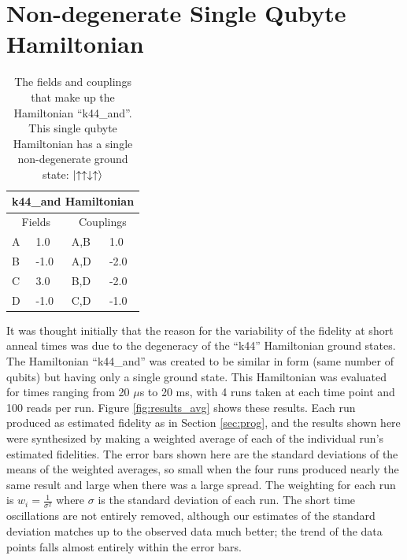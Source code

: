 \section{Non-degenerate Single Qubyte Hamiltonian}

\begin{table}
	\begin{center}
\begin{tabular}{ | l | l | l | l |}
	\hline
	\multicolumn{4}{|c|}{k44\_and Hamiltonian} \\ \hline
	\multicolumn{2}{|c|}{Fields} & \multicolumn{2}{c|}{Couplings} \\ \hline
	A & 1.0 & A,B & 1.0 \\
	B & -1.0 & A,D & -2.0 \\
	C & 3.0 & B,D & -2.0 \\
	D & -1.0 & C,D & -1.0 \\ \hline
\end{tabular}
\end{center}
\caption[k44\_and Hamiltonian]{The fields and couplings that make up the Hamiltonian ``k44\_and''.  This single qubyte Hamiltonian has a single non-degenerate ground state: $\mathinner{|{\uparrow\uparrow\downarrow\uparrow}\rangle}$ }
\label{tab:k44_and}
\end{table}
It was thought initially that the reason for the variability of the fidelity at short anneal times was due to the degeneracy of the ``k44'' Hamiltonian ground states.  The Hamiltonian ``k44\_and'' was created to be similar in form (same number of qubits) but having only a single ground state.  This Hamiltonian was evaluated for times ranging from 20 $\mu$s to 20 ms, with 4 runs taken at each time point and 100 reads per run.  Figure \ref{fig:results_avg} shows these results.  Each run produced as estimated fidelity as in Section \ref{sec:prog}, and the results shown here were synthesized by making a weighted average of each of the individual run's estimated fidelities.  The error bars shown here are the standard deviations of the means of the weighted averages, so small when the four runs produced nearly the same result and large when there was a large spread.  The weighting for each run is $w_i = \frac{1}{\sigma^2}$ where $\sigma$ is the standard deviation of each run.  The short time oscillations are not entirely removed, although our estimates of the standard deviation matches up to the observed data much better; the trend of the data points falls almost entirely within the error bars.

